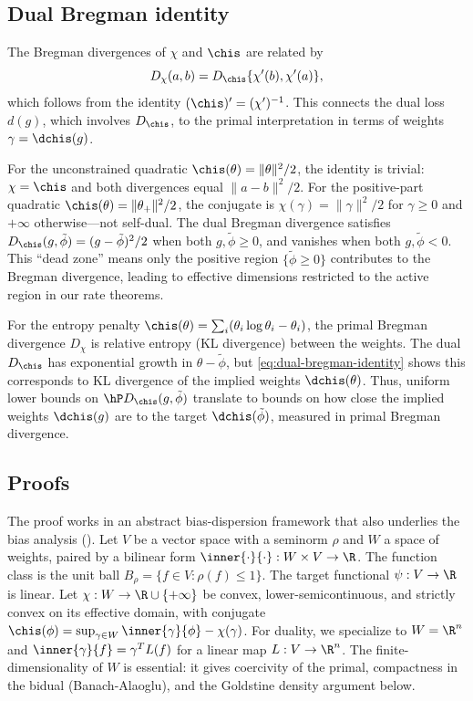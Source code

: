 \documentclass{article}
\begin{document}
\subsection{Dual Bregman identity}
The Bregman divergences of $\chi$ and $\chis$ are related by
\begin{equation}
\label{eq:dual-bregman-identity}
D_\chi(a, b) = D_{\chis}\{\chi'(b), \chi'(a)\},
\end{equation}
which follows from the identity $(\chis)' = (\chi')^{-1}$. This connects the dual loss $d(g)$, which involves $D_{\chis}$, to the primal interpretation in terms of weights $\gamma = \dchis(g)$.

For the unconstrained quadratic $\chis(\theta) = \|\theta\|^2/2$, the identity is trivial: $\chi = \chis$ and both divergences equal $\|a-b\|^2/2$. For the positive-part quadratic $\chis(\theta) = \|\theta_+\|^2/2$, the conjugate is $\chi(\gamma) = \|\gamma\|^2/2$ for $\gamma \ge 0$ and $+\infty$ otherwise---not self-dual. The dual Bregman divergence satisfies $D_{\chis}(g, \tilde\phi) = (g - \tilde\phi)^2/2$ when both $g, \tilde\phi \ge 0$, and vanishes when both $g, \tilde\phi < 0$. This ``dead zone'' means only the positive region $\{\tilde\phi \ge 0\}$ contributes to the Bregman divergence, leading to effective dimensions restricted to the active region in our rate theorems.

For the entropy penalty $\chis(\theta) = \sum_i (\theta_i \log \theta_i - \theta_i)$, the primal Bregman divergence $D_\chi$ is relative entropy (KL divergence) between the weights. The dual $D_{\chis}$ has exponential growth in $\theta - \tilde\phi$, but \eqref{eq:dual-bregman-identity} shows this corresponds to KL divergence of the implied weights $\dchis(\theta)$. Thus, uniform lower bounds on $\hP D_{\chis}(g, \tilde\phi)$ translate to bounds on how close the implied weights $\dchis(g)$ are to the target $\dchis(\tilde\phi)$, measured in primal Bregman divergence.

\subsection{Proofs}
\label{sec:duality-proofs}

The proof works in an abstract bias-dispersion framework that also underlies the bias analysis (). Let $V$ be a vector space with a seminorm $\rho$ and $W$ a space of weights, paired by a bilinear form $\inner{\cdot}{\cdot}: W \times V \to \R$. The function class is the unit ball $B_\rho = \{f \in V : \rho(f) \le 1\}$. The target functional $\psi: V \to \R$ is linear. Let $\chi: W \to \R \cup \{+\infty\}$ be convex, lower-semicontinuous, and strictly convex on its effective domain, with conjugate $\chis(\phi) = \sup_{\gamma \in W} \inner{\gamma}{\phi} - \chi(\gamma)$. For duality, we specialize to $W = \R^n$ and $\inner{\gamma}{f} = \gamma^T L(f)$ for a linear map $L: V \to \R^n$. The finite-dimensionality of $W$ is essential: it gives coercivity of the primal, compactness in the bidual (Banach-Alaoglu), and the Goldstine density argument below.
\end{document}
